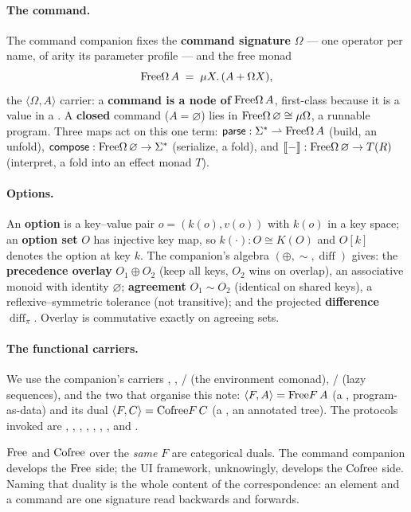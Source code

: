 \documentclass[../uxoxo-main]{subfiles}
\begin{document}
\paragraph{The command.}
The command companion fixes the \textbf{command signature} $\Omega$ --- one
operator per name, of arity its parameter profile --- and the free monad
\[
  \mathrm{Free}\Omega\,A \;=\; \mu X.\,(A + \Omega X),
\]
the $\langle\Omega,A\rangle$ carrier: a \textbf{command is a node of}
$\mathrm{Free}\Omega\,A$, first-class because it is a value in a . A
\textbf{closed} command ($A=\varnothing$) lies in $\mathrm{Free}\Omega\,\varnothing\cong
\mu\Omega$, a runnable program. Three maps act on this one term:
$\mathsf{parse}:\Sigma^{*}\rightharpoonup\mathrm{Free}\Omega\,A$ (build, an unfold), $\mathsf{compose}:
\mathrm{Free}\Omega\,\varnothing\to\Sigma^{*}$ (serialize, a fold), and $\llbracket - \rrbracket:
\mathrm{Free}\Omega\,\varnothing\to T(R)$ (interpret, a fold into an effect monad $T$).

\paragraph{Options.}
An \textbf{option} is a key--value pair $o=(k(o),v(o))$ with $k(o)$ in a key
space; an \textbf{option set} $O$ has injective key map, so $k(\cdot):O\cong K(O)$
and $O[k]$ denotes the option at key $k$. The companion's algebra
$(\oplus,\sim,\operatorname{diff})$ gives: the \textbf{precedence overlay}
$O_1\oplus O_2$ (keep all keys, $O_2$ wins on overlap), an associative monoid with
identity $\varnothing$; \textbf{agreement} $O_1\sim O_2$ (identical on shared
keys), a reflexive--symmetric tolerance (not transitive); and the projected
\textbf{difference} $\operatorname{diff}_\pi$. Overlay is commutative exactly on
agreeing sets.

\paragraph{The functional carriers.}
We use the companion's carriers , , /
(the environment comonad), / (lazy sequences), and the two
that organise this note: $\langle F,A\rangle=\mathrm{Free} F\,A$ (a ,
program-as-data) and its dual $\langle F,C\rangle=\mathrm{Cofree} F\,C$ (a
, an annotated tree). The protocols invoked are ,
, , , , ,
, and .

\begin{remark}\label{rem:thesis}
$\mathrm{Free}$ and $\mathrm{Cofree}$ over the \emph{same} $F$ are categorical duals. The command
companion develops the $\mathrm{Free}$ side; the UI framework, unknowingly, develops the
$\mathrm{Cofree}$ side. Naming that duality is the whole content of the correspondence:
an element and a command are one signature read backwards and forwards.
\end{remark}
\end{document}
